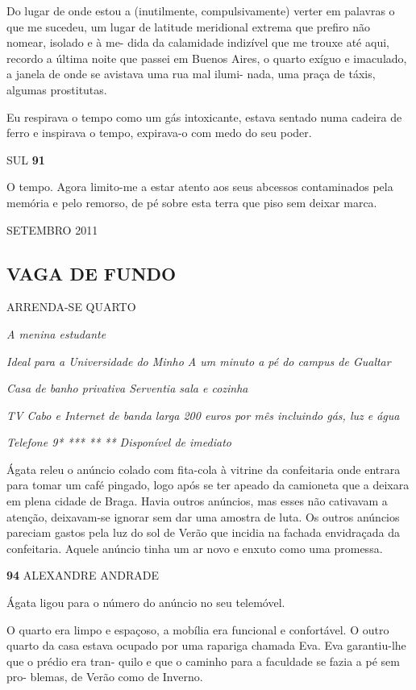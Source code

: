 Do lugar de onde estou a (inutilmente, compulsivamente) verter em
palavras o que me sucedeu, um lugar de latitude meridional extrema que
prefiro não nomear, isolado e à me- dida da calamidade indizível que me
trouxe até aqui, recordo a última noite que passei em Buenos Aires, o
quarto exíguo e imaculado, a janela de onde se avistava uma rua mal
ilumi- nada, uma praça de táxis, algumas prostitutas.

Eu respirava o tempo como um gás intoxicante, estava sentado numa
cadeira de ferro e inspirava o tempo, expirava-o com medo do seu poder.

SUL \textbf{91}

O tempo. Agora limito-me a estar atento aos seus abcessos contaminados
pela memória e pelo remorso, de pé sobre esta terra que piso sem deixar
marca.

SETEMBRO 2011

\subsection{VAGA DE FUNDO}

ARRENDA-SE QUARTO

\emph{A menina estudante}

\emph{Ideal para a Universidade do Minho A um minuto a pé do campus de
Gualtar}

\emph{Casa de banho privativa Serventia sala e cozinha}

\emph{TV Cabo e Internet de banda larga 200 euros por mês incluindo gás,
luz e água}

\emph{Telefone 9* *** ** ** Disponível de imediato}

Ágata releu o anúncio colado com fita-cola à vitrine da confeitaria onde
entrara para tomar um café pingado, logo após se ter apeado da camioneta
que a deixara em plena cidade de Braga. Havia outros anúncios, mas esses
não cativavam a atenção, deixavam-se ignorar sem dar uma amostra de
luta. Os outros anúncios pareciam gastos pela luz do sol de Verão que
incidia na fachada envidraçada da confeitaria. Aquele anúncio tinha um
ar novo e enxuto como uma promessa.

\textbf{94 }ALEXANDRE ANDRADE

Ágata ligou para o número do anúncio no seu telemóvel.

O quarto era limpo e espaçoso, a mobília era funcional e confortável. O
outro quarto da casa estava ocupado por uma rapariga chamada Eva. Eva
garantiu-lhe que o prédio era tran- quilo e que o caminho para a
faculdade se fazia a pé sem pro- blemas, de Verão como de Inverno.

